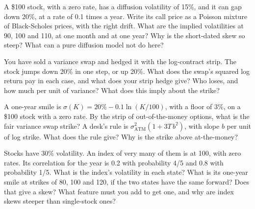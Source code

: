 \begin{question}\label{iq:iv2:vol-surface-and-vol-trading:33}
A \$100 stock, with a zero rate, has a diffusion volatility of 15\%, and it can gap down 20\%, at a rate of 0.1 times a year. Write its call price as a Poisson mixture of Black-Scholes prices, with the right drift. What are the implied volatilities at 90, 100 and 110, at one month and at one year? Why is the short-dated skew so steep? What can a pure diffusion model not do here?
\end{question}

\begin{question}\label{iq:iv2:vol-surface-and-vol-trading:34}
You have sold a variance swap and hedged it with the log-contract strip. The stock jumps down 20\% in one step, or up 20\%. What does the swap's squared log return pay in each case, and what does your strip hedge give? Who loses, and how much per unit of variance? What does this imply about the strike?
\end{question}

\begin{question}\label{iq:iv2:vol-surface-and-vol-trading:35}
A one-year smile is $\sigma(K) = 20\% - 0.1\ln(K/100)$, with a floor of 3\%, on a \$100 stock with a zero rate. By the strip of out-of-the-money options, what is the fair variance swap strike? A desk's rule is $\sigma_{\text{ATM}}^2(1 + 3T\,b^2)$, with slope $b$ per unit of log strike. What does the rule give? Why is the strike above at-the-money?
\end{question}

\begin{question}\label{iq:iv2:vol-surface-and-vol-trading:36}
Stocks have 30\% volatility. An index of very many of them is at 100, with zero rates. Its correlation for the year is 0.2 with probability 4/5 and 0.8 with probability 1/5. What is the index's volatility in each state? What is its one-year smile at strikes of 80, 100 and 120, if the two states have the same forward? Does that give a skew? What feature must you add to get one, and why are index skews steeper than single-stock ones?
\end{question}

